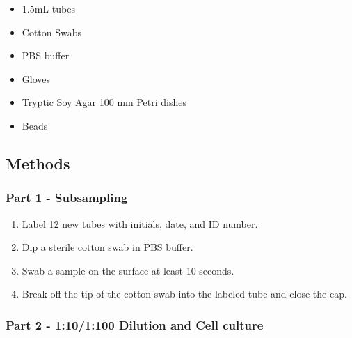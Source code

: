 \documentclass[]{article}
\providecommand{\tightlist}{%
  \setlength{\itemsep}{0pt}\setlength{\parskip}{0pt}}
\begin{document}
\begin{itemize}
\tightlist
\item
  1.5mL tubes
\item
  Cotton Swabs
\item
  PBS buffer
\item
  Gloves
\item
  Tryptic Soy Agar 100 mm Petri dishes
\item
  Beads
\end{itemize}

\hypertarget{methods}{%
\subsection{Methods}\label{methods}}

\hypertarget{part-1---subsampling}{%
\subsubsection{Part 1 - Subsampling}\label{part-1---subsampling}}

\begin{enumerate}
\def\labelenumi{\arabic{enumi}.}
\tightlist
\item
  Label 12 new tubes with initials, date, and ID number.
\item
  Dip a sterile cotton swab in PBS buffer.
\item
  Swab a sample on the surface at least 10 seconds.
\item
  Break off the tip of the cotton swab into the labeled tube and close
  the cap.
\end{enumerate}

\hypertarget{part-2---1101100-dilution-and-cell-culture}{%
\subsubsection{Part 2 - 1:10/1:100 Dilution and Cell
culture}\label{part-2---1101100-dilution-and-cell-culture}}
\end{document}
